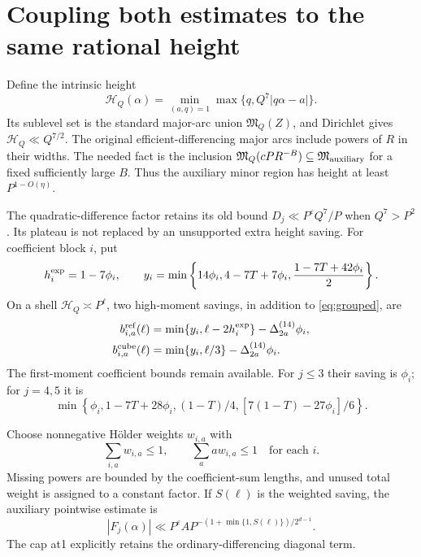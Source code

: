 \documentclass[11pt,letterpaper]{article}
\theoremstyle{remark}
\newcommand{\M}{\mathfrak M}
\newcommand{\HH}{\mathcal H}
\newcommand{\eps}{\varepsilon}
\begin{document}
\section{Coupling both estimates to the same rational height}

Define the intrinsic height
\begin{equation}\label{eq:height}
 \HH_Q(\alpha)=\min_{(a,q)=1}\max\{q,Q^7|q\alpha-a|\}.
\end{equation}
Its sublevel set is the standard major-arc union $\M_Q(Z)$, and Dirichlet gives
$\HH_Q\ll Q^{7/2}$. The original efficient-differencing major arcs include powers
of $R$ in their widths. The needed fact is the inclusion
$\M_Q(cPR^{-B})\subseteq\M_{\rm auxiliary}$ for a fixed sufficiently large $B$.
Thus the auxiliary minor region has height at least $P^{1-O(\eta)}$.

The quadratic-difference factor retains its old bound
$D_j\ll P^\eps Q^7/P$ when $Q^7>P^2$. Its plateau is not replaced by an
unsupported extra height saving. For coefficient block $i$, put
\[
 h_i^{\rm exp}=1-7\phi_i,\qquad
 y_i=\min\left\{14\phi_i,4-7T+7\phi_i,
                         \frac{1-7T+42\phi_i}{2}\right\}.
\]
On a shell $\HH_Q\asymp P^\ell$, two high-moment savings, in addition to
\eqref{eq:grouped}, are
\begin{align}
 b_{i,a}^{\rm ref}(\ell)
   &=\min\{y_i,\ell-2h_i^{\rm exp}\}
                              -\Delta_{2a}^{(14)}\phi_i,\label{eq:ref}\\
 b_{i,a}^{\rm cube}(\ell)
   &=\min\{y_i,\ell/3\}
                              -\Delta_{2a}^{(14)}\phi_i.\label{eq:cube}
\end{align}
The first-moment coefficient bounds remain available. For $j\le3$ their saving is
$\phi_i$; for $j=4,5$ it is
\[
 \min\left\{\phi_i,1-7T+28\phi_i,(1-T)/4,
                          [7(1-T)-27\phi_i]/6\right\}.
\]

Choose nonnegative H\"older weights $w_{i,a}$ with
\[
 \sum_{i,a}w_{i,a}\le1,\qquad
 \sum_a a w_{i,a}\le1\quad\text{for each }i.
\]
Missing powers are bounded by the coefficient-sum lengths, and unused total weight
is assigned to a constant factor. If $S(\ell)$ is the weighted saving, the auxiliary
pointwise estimate is
\begin{equation}\label{eq:pointwise}
 |F_j(\alpha)|\ll P^\eps A
     P^{-(1+\min\{1,S(\ell)\})/2^{d-1}}.
\end{equation}
The cap at1 explicitly retains the ordinary-differencing diagonal term.
\end{document}
